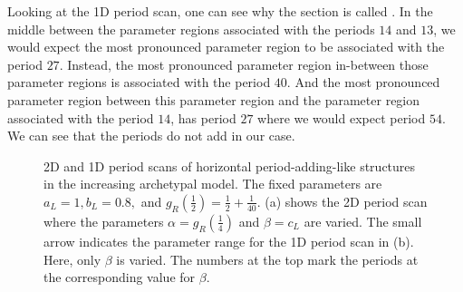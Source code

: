 Looking at the 1D period scan, one can see why the section is called .
In the middle between the parameter regions associated with the periods $14$ and $13$, we would expect the most pronounced parameter region to be associated with the period $27$.
Instead, the most pronounced parameter region in-between those parameter regions is associated with the period $40$.
And the most pronounced parameter region between this parameter region and the parameter region associated with the period $14$, has period $27$ where we would expect period $54$.
We can see that the periods do not add in our case.

\begin{figure}
	\centering
	\caption[2D and 1D period scans of horizontal period-adding-like structures in the increasing archetypal model]{
		2D and 1D period scans of horizontal period-adding-like structures in the increasing archetypal model.
		The fixed parameters are $a_L = 1, b_L = 0.8,$ and $g_R\left(\frac{1}{2}\right) = \frac{1}{2} + \frac{1}{40}$.
		(a) shows the 2D period scan where the parameters $\alpha = g_R\left(\frac{1}{4}\right)$ and $\beta = c_L$ are varied.
		The small arrow indicates the parameter range for the 1D period scan in (b).
		Here, only $\beta$ is varied.
		The numbers at the top mark the periods at the corresponding value for $\beta$.
	}
	\label{fig:add.add.like.hor}
\end{figure}

